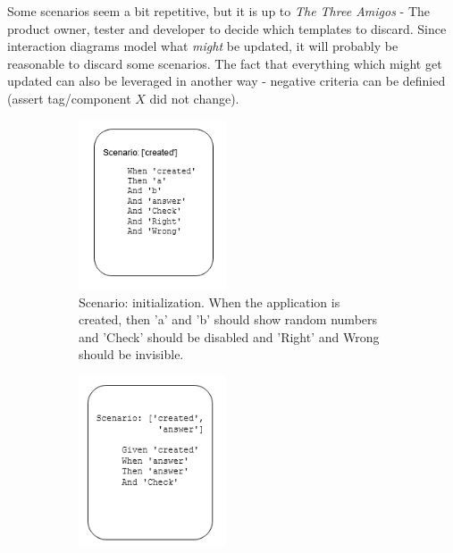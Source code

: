 Some scenarios seem a bit repetitive, but it is up to \textit{The Three Amigos} - The product owner, tester and developer \parencite{cucumber_amigos} to decide which templates to discard. Since interaction diagrams model what \textit{might} be updated, it will probably be reasonable to discard some scenarios. The fact that everything which might get updated can also be leveraged in another way - negative criteria can be definied (assert tag/component $X$ did not change).
\begin{figure}[H]
    \label{fig:eval_scenarios_0}
    \caption{Gherkin scenarios templates and sample human written scenarios based on the templates }
    \centering
    \begin{subfigure}[b]{0.48\textwidth}
         \centering
         \includegraphics[width=0.48\textwidth]{images/scenarios_1.png}
         \caption{Scenario: initialization. When the application is created, then 'a' and 'b' should show random numbers and 'Check' should be disabled and 'Right' and Wrong should be invisible.}
    \end{subfigure}\hfill%
    \begin{subfigure}[b]{0.48\textwidth}
        \centering
        \includegraphics[width=0.48\textwidth]{images/scenarios_2.png}

\end{subfigure}
\end{figure}
